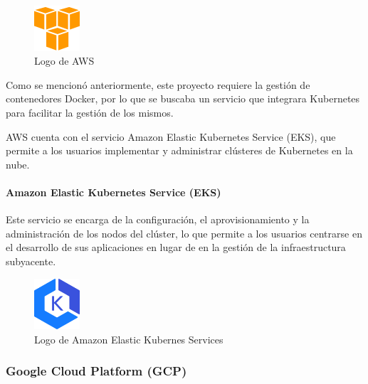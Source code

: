                 \begin{figure}[htbp]
                    \centering

                    \includegraphics[width=0.15\textwidth]{images/Logos/aws.png}
                    \caption{Logo de AWS}

                    \label{fig:aws-logo}
                \end{figure}

                Como se mencionó anteriormente, este proyecto requiere la gestión de contenedores Docker, por lo que se buscaba un servicio que integrara Kubernetes para facilitar la gestión de los mismos.

                AWS cuenta con el servicio Amazon Elastic Kubernetes Service (EKS), que permite a los usuarios implementar y administrar clústeres de Kubernetes en la nube.

                \paragraph{Amazon Elastic Kubernetes Service (EKS)}

                    Este servicio se encarga de la configuración, el aprovisionamiento y la administración de los nodos del clúster, lo que permite a los usuarios centrarse en el desarrollo de sus aplicaciones en lugar de en la gestión de la infraestructura subyacente. 
                    
                    \begin{figure}[htbp]
                        \centering
    
                        \includegraphics[width=0.15\textwidth]{images/Logos/eks.png}
                        \caption{Logo de Amazon Elastic Kubernes Services}
    
                        \label{fig:eks-logo}
                    \end{figure}


            \subsubsection{Google Cloud Platform (GCP)}

